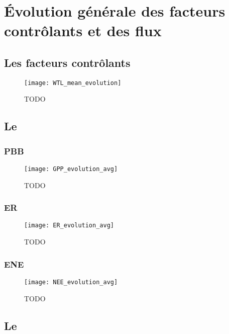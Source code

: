\section{Évolution générale des facteurs contrôlants et des flux}

\subsection{Les facteurs contrôlants}

\begin{figure}
\centering
\texttt{[image: WTL\_mean\_evolution]}
\caption{TODO}
\label{fig:WTL_mean_evolution}
\end{figure}

\subsection{Le \coo}

\subsubsection{PBB}

\begin{figure}
\centering
\texttt{[image: GPP\_evolution\_avg]}
\caption{TODO}
\label{fig:GPP_evolution_avg}
\end{figure}

\subsubsection{ER}

\begin{figure}
\centering
\texttt{[image: ER\_evolution\_avg]}
\caption{TODO}
\label{fig:ER_evolution_avg}
\end{figure}

\subsubsection{ENE}

\begin{figure}
\centering
\texttt{[image: NEE\_evolution\_avg]}
\caption{TODO}
\label{fig:NEE_evolution_avg}
\end{figure}

\subsection{Le \chh}
